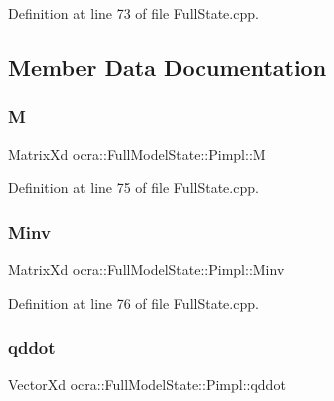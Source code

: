Definition at line 73 of file Full\+State.\+cpp.



\subsection{Member Data Documentation}
\hypertarget{structocra_1_1FullModelState_1_1Pimpl_a0482896483cb287cfc1066df1326f250}{}\label{structocra_1_1FullModelState_1_1Pimpl_a0482896483cb287cfc1066df1326f250} 
\subsubsection{\texorpdfstring{M}{M}}
{\footnotesize\ttfamily Matrix\+Xd ocra\+::\+Full\+Model\+State\+::\+Pimpl\+::M}



Definition at line 75 of file Full\+State.\+cpp.

\hypertarget{structocra_1_1FullModelState_1_1Pimpl_a66abf4494ddc5e7de0fbdeee4d6404d0}{}\label{structocra_1_1FullModelState_1_1Pimpl_a66abf4494ddc5e7de0fbdeee4d6404d0} 
\subsubsection{\texorpdfstring{Minv}{Minv}}
{\footnotesize\ttfamily Matrix\+Xd ocra\+::\+Full\+Model\+State\+::\+Pimpl\+::\+Minv}



Definition at line 76 of file Full\+State.\+cpp.

\hypertarget{structocra_1_1FullModelState_1_1Pimpl_a9575456409af57d39f990f2dda27c23f}{}\label{structocra_1_1FullModelState_1_1Pimpl_a9575456409af57d39f990f2dda27c23f} 
\subsubsection{\texorpdfstring{qddot}{qddot}}
{\footnotesize\ttfamily Vector\+Xd ocra\+::\+Full\+Model\+State\+::\+Pimpl\+::qddot}



